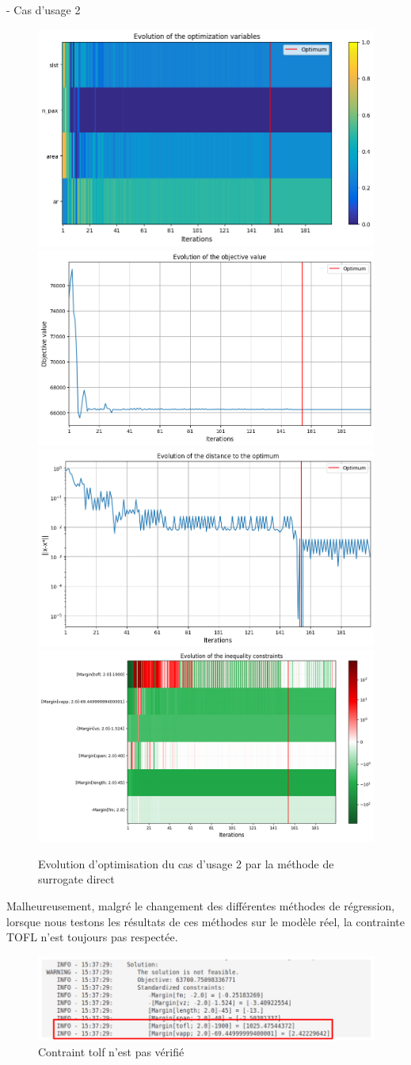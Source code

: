 \documentclass[a4paper, 11pt]{article}
\begin{document}
- Cas d'usage 2 
\begin{figure}[H]
    \centering
    \includegraphics[width=0.45\linewidth]{Images_case_2/p3u2_direct.png}
    \includegraphics[width=0.45\linewidth]{Images_case_2/p3u2_direct_evol_obj.png}
    \includegraphics[width=0.45\linewidth]{Images_case_2/p3u2_direct_evol_dist.png}
    \includegraphics[width=0.45\linewidth]{Images_case_2/p3u2_direct_evol_constraint.png}
    \caption{Evolution d'optimisation du cas d'usage 2 par la méthode de surrogate direct}
    \label{fig:p3u2_direct}
\end{figure}

Malheureusement, malgré le changement des différentes méthodes de régression, lorsque nous testons les résultats de ces méthodes sur le modèle réel, la contrainte TOFL n’est toujours pas respectée.

\begin{figure}[H]
    \centering
    \includegraphics[width=0.85\linewidth]{Images_case_2/contraint_non_verif.png}
    \caption{Contraint tolf n'est pas vérifié}
    \label{fig:enter-label}
\end{figure}
\end{document}
